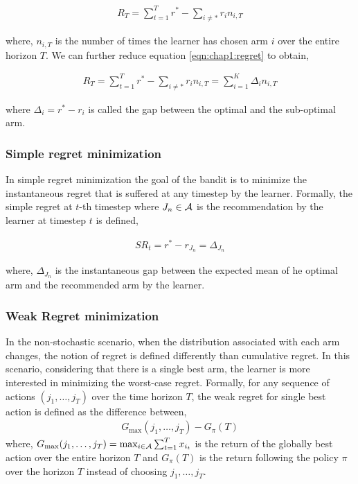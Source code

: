 \begin{eqnarray}
R_{T} = \sum_{t=1}^{T}r^* - \sum_{i\neq *}r_{i}n_{i,T} \label{eqn:chap1:regret}
\end{eqnarray}

where, $n_{i,T}$ is the number of times the learner has chosen arm $i$ over the entire horizon $T$. We can further reduce equation \ref{eqn:chap1:regret} to obtain,

\begin{align*}
R_{T} = \sum_{t=1}^{T}r^* - \sum_{i\neq *}r_{i}n_{i,T} = \sum_{i=1}^{K}\Delta_{i}n_{i,T}
\end{align*}

where $\Delta_{i}=r^* - r_i$ is called the gap between the optimal and the sub-optimal arm.

\subsubsection{Simple regret minimization}
In simple regret minimization the goal of the bandit is to minimize the instantaneous regret that is suffered at any  timestep by the learner. Formally, the simple regret at $t$-th timestep where $J_n\in\mathcal{A}$ is the recommendation by the learner at timestep $t$ is defined,

\begin{align*}
SR_{t} = r^* - r_{J_{n}} = \Delta_{J_n}
\end{align*}

where, $\Delta_{J_n}$ is the instantaneous gap between the expected mean of he optimal arm and the recommended arm by the learner.

\subsubsection{Weak Regret minimization}
In the non-stochastic scenario, when the distribution associated with each arm changes, the notion of regret is defined differently than cumulative regret. In this scenario, considering that there is a single best arm, the learner is more interested in minimizing the worst-case regret. Formally, for any sequence of actions $\left( j_1, \ldots , j_T \right)$ over the time horizon $T$, the weak regret for single best action is defined as the difference between,
\begin{align*}
G_{\max}(j_1,\ldots,j_T) - G_{\pi}(T)
\end{align*}
where, $G_{\max}(j_1,\ldots,j_T) = \max_{i\in\mathcal{A}}\sum_{t=1}^{T}x_{i_t}$ is the return of the globally best action over the entire horizon $T$ and $G_{\pi}(T)$ is the return following the policy $\pi$ over the horizon $T$ instead of choosing $j_1,\ldots,j_T$.



